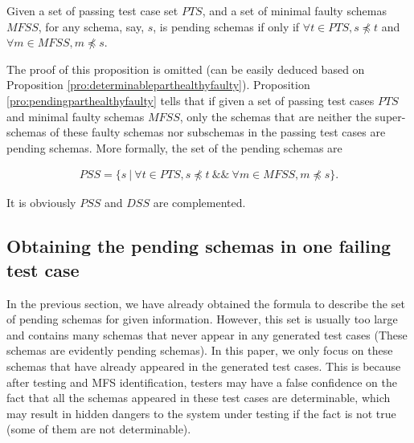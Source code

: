 
\begin{proposition}\label{pro:pendingparthealthyfaulty}
Given a set of passing test case set $PTS$, and a set of minimal faulty schemas $MFSS$, for any schema, say, $s$, is pending schemas if only if $\forall t \in PTS, s \npreceq t$ and $\forall m \in MFSS, m \npreceq s$.
\end{proposition}

The proof of this proposition is omitted (can be easily deduced based on Proposition \ref{pro:determinableparthealthyfaulty}). Proposition \ref{pro:pendingparthealthyfaulty} tells that if given a set of passing test cases $PTS$ and minimal faulty schemas $MFSS$, only the schemas that are neither the super-schemas of these faulty schemas nor subschemas in the passing test cases are pending schemas.  More formally, the set of the pending schemas are

\begin{equation}
\begin{aligned}\label{eq:pss}
PSS=\{ s\ |\ \forall t \in PTS,  s \npreceq t  \ \&\& \  \forall m \in MFSS, m \npreceq s \}.
\end{aligned}
\end{equation}

It is obviously $PSS$ and $DSS$ are complemented.

%
%

%

\subsection{Obtaining the pending schemas in one failing test case}\label{sec:pending:obtaining}

In the previous section, we have already obtained the formula to describe the set of pending schemas for given information. However, this set is usually too large and contains many schemas that never appear in any generated test cases (These schemas are evidently pending schemas). In this paper, we only focus on these schemas that have already appeared in the generated test cases. This is because after testing and MFS identification, testers may have a false confidence on the fact that all the schemas appeared in these test cases are determinable, which may result in hidden dangers to the system under testing if the fact is not true (some of them are not determinable).


